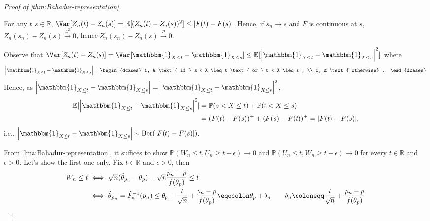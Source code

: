 \begin{proof}[Proof of \autoref{thm:Bahadur-representation}]
	\begin{claim}\label{clm:pf:Bahadur-representation}
		For any \(t, s\in \mathbb{R} \), \(\Var_{}[Z_n(t) - Z_n(s)] = \mathbb{E}_{}[(Z_n(t) - Z_n(s))^2] \leq \vert F(t) - F(s) \vert \). Hence, if \(s_n \to s\) and \(F\) is continuous at \(s\), \(Z_n(s_n) - Z_n(s) \overset{L^2}{\to} 0\), hence \(Z_n(s_n) - Z_n(s) \overset{p}{\to} 0\).
	\end{claim}
	\begin{explanation}
		Observe that \(\Var_{}[Z_n(t) - Z_n(s)] = \Var_{}[\mathbbm{1}_{X \leq t} - \mathbbm{1}_{X \leq s} ] \leq \mathbb{E}_{}[\left\vert \mathbbm{1}_{X \leq t} - \mathbbm{1}_{X \leq s} \right\vert ^2 ]\) where
		\[
			\left\vert \mathbbm{1}_{X \leq t} - \mathbbm{1}_{X \leq s} \right\vert
			= \begin{dcases}
				1, & \text{ if } s < X \leq t \text{ or } t < X \leq s ; \\
				0, & \text{ otherwise} .
			\end{dcases}
		\]
		Hence, as \(\left\vert \mathbbm{1}_{X \leq t} - \mathbbm{1}_{X \leq s} \right\vert = \left\vert \mathbbm{1}_{X \leq t} - \mathbbm{1}_{X \leq s} \right\vert^2\),
		\[
			\begin{split}
				\mathbb{E}_{}[\left\vert \mathbbm{1}_{X \leq t} - \mathbbm{1}_{X \leq s} \right\vert ^2 ]
				 & = \mathbb{P} (s < X \leq t) + \mathbb{P} (t < X \leq s) \\
				 & = (F(t) - F(s))^+ + (F(s) - F(t))^+
				= \vert F(t) - F(s) \vert,
			\end{split}
		\]
		i.e., \(\left\vert \mathbbm{1}_{X \leq t} - \mathbbm{1}_{X \leq s} \right\vert \sim \operatorname{Ber}(\vert F(t) - F(s) \vert ) \).
	\end{explanation}
	From \autoref{lma:Bahadur-representation}, it suffices to show \(\mathbb{P} (W_n \leq t, U_n \geq t + \epsilon ) \to 0\) and \(\mathbb{P} (U_n \leq t , W_n \geq t+\epsilon ) \to 0\) for every \(t \in \mathbb{R} \) and \(\epsilon > 0\). Let's show the first one only. Fix \(t \in \mathbb{R} \) and \(\epsilon > 0\), then
	\begin{align*}
		W_n \leq t
		 & \iff \sqrt{n} (\hat{\theta} _{p_n} - \theta _p) - \sqrt{n} \frac{p_n - p}{f(\theta _p)} \leq t                                                                                                                                                        \\
		 & \iff \hat{\theta} _{p_n} = \hat{F} _n ^{-1} (p_n) \leq \theta _p + \frac{t}{\sqrt{n} } + \frac{p_n - p}{f(\theta _p)} \eqqcolon \theta _p + \delta _n \tag*{\(\displaystyle \delta _n \coloneqq \frac{t}{\sqrt{n} } + \frac{p_n - p}{f(\theta _p)}\)} \\

\end{align*}
\end{proof}
